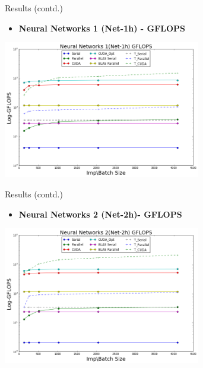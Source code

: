 \begin{frame}{Results (contd.)}
     \begin{itemize}
         \item{ \textbf{Neural Networks 1 (Net-1h) - GFLOPS}
         }
     \end{itemize}
     
		\begin{center}
		\includegraphics[width=3.4in]{nn1_gflops.png}
		\end{center}

 \end{frame} 

\begin{frame}{Results (contd.)}
     \begin{itemize}
         \item{ \textbf{Neural Networks 2 (Net-2h)- GFLOPS}
         }
     \end{itemize}
     
		\begin{center}
		\includegraphics[width=3.4in]{nn2_gflops.png}
		\end{center}

 \end{frame} 

